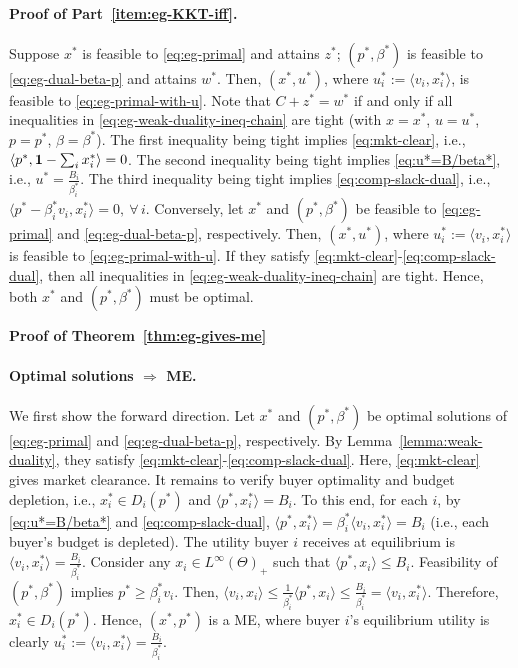 	\paragraph{Proof of Part~\ref{item:eg-KKT-iff}.} 
	Suppose $x^*$ is feasible to \eqref{eq:eg-primal} and attains $z^*$; $(p^*, \beta^*)$ is feasible to \eqref{eq:eg-dual-beta-p} and attains $w^*$. 
	Then, $(x^*, u^*)$, where $u^*_i := \langle v_i, x^*_i \rangle$, is feasible to \eqref{eq:eg-primal-with-u}. Note that $C + z^* = w^*$ if and only if all inequalities in \eqref{eq:eg-weak-duality-ineq-chain} are tight (with $x = x^*$, $u = u^*$, $p = p^*$, $\beta = \beta^*$). The first inequality being tight implies \eqref{eq:mkt-clear}, i.e., 
	$ \left\langle p^*, \mathbf{1} - \sum_i x^*_i \right \rangle = 0$.
	The second inequality being tight implies \eqref{eq:u*=B/beta*}, i.e.,
	$ u^* = \frac{B_i}{\beta^*_i}$.
	The third inequality being tight implies \eqref{eq:comp-slack-dual}, i.e.,
	$ \langle p^* - \beta^*_i v_i, x^*_i \rangle = 0,\ \forall\, i$. 
	Conversely, let $x^*$ and $(p^*, \beta^*)$ be feasible to \eqref{eq:eg-primal} and \eqref{eq:eg-dual-beta-p}, respectively. Then, $(x^*, u^*)$, where $u^*_i := \langle v_i, x^*_i \rangle$ is feasible to \eqref{eq:eg-primal-with-u}. 
	If they satisfy \eqref{eq:mkt-clear}-\eqref{eq:comp-slack-dual}, then all inequalities in \eqref{eq:eg-weak-duality-ineq-chain} are tight. 
	Hence, both $x^*$ and $(p^*, \beta^*)$ must be optimal.

	\smallskip\noindent\textbf{Proof of Theorem~\ref{thm:eg-gives-me}}

	\paragraph{Optimal solutions $\Rightarrow$ ME.}
	We first show the forward direction. Let $x^*$ and $(p^*, \beta^*)$ be optimal solutions of \eqref{eq:eg-primal} and \eqref{eq:eg-dual-beta-p}, respectively. By Lemma~\ref{lemma:weak-duality}, they satisfy \eqref{eq:mkt-clear}-\eqref{eq:comp-slack-dual}.
	Here, \eqref{eq:mkt-clear} gives market clearance. 
	It remains to verify buyer optimality and budget depletion, i.e., $x^*_i \in D_i(p^*)$ and $\langle p^*, x^*_i \rangle = B_i$. 
	To this end, for each $i$, by \eqref{eq:u*=B/beta*} and \eqref{eq:comp-slack-dual},
		$\langle p^*, x^*_i\rangle  = \beta^*_i \langle v_i, x^*_i\rangle = B_i$ (i.e., each buyer's budget is depleted). The utility buyer $i$ receives at equilibrium is
	 $\langle v_i, x^*_i\rangle = \frac{B_i}{\beta^*_i}$. 
	Consider any $x_i\in L^\infty(\Theta)_+$ such that $\langle p^*, x_i \rangle \leq B_i$. Feasibility of $(p^*, \beta^*)$ implies $p^* \geq \beta^*_i v_i$. Then,
	$ \langle v_i, x_i\rangle \leq \frac{1}{\beta^*_i} \langle p^*, x_i \rangle \leq \frac{B_i}{\beta^*_i} = \langle v_i, x^*_i \rangle$.
	Therefore, 
	$x^*_i \in D_i(p^*)$.
	Hence, $(x^*, p^*)$ is a ME, where buyer $i$'s equilibrium utility is clearly $u^*_i := \langle v_i, x^*_i \rangle = \frac{B_i}{\beta^*_i}$.
	
